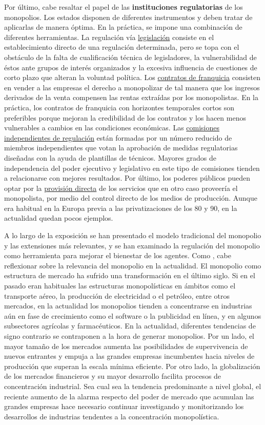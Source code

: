 \documentclass{nuevotema}
\begin{document}
Por último, cabe resaltar el papel de las \textbf{instituciones regulatorias} de los monopolios. Los estados disponen de diferentes instrumentos y deben tratar de aplicarlas de manera óptima. En la práctica, se impone una combinación de diferentes herramientas. La regulación vía \underline{legislación} consiste en el establecimiento directo de una regulación determinada, pero se topa con el obstáculo de la falta de cualificación técnica de legisladores, la vulnerabilidad de éstos ante grupos de interés organizados y la excesiva influencia de cuestiones de corto plazo que alteran la voluntad política. Los \underline{contratos de franquicia} consisten en vender a las empresas el derecho a monopolizar de tal manera que los ingresos derivados de la venta compensen las rentas extraídas por los monopolistas. En la práctica, los contratos de franquicia con horizontes temporales cortos son preferibles porque mejoran la credibilidad de los contratos y los hacen menos vulnerables a cambios en las condiciones económicas. Las \underline{comisiones independientes de regulación} están formadas por un número reducido de miembros independientes que votan la aprobación de medidas regulatorias diseñadas con la ayuda de plantillas de técnicos. Mayores grados de independencia del poder ejecutivo y legislativo en este tipo de comisiones tienden a relacionarse con mejores resultados. Por último, los poderes públicos pueden optar por la \underline{provisión directa} de los servicios que en otro caso proveería el monopolista, por medio del control directo de los medios de producción. Aunque era habitual en la Europa previa a las privatizaciones de los 80 y 90, en la actualidad quedan pocos ejemplos. 

A lo largo de la exposición se han presentado el modelo tradicional del monopolio y las extensiones más relevantes, y se han examinado la regulación del monopolio como herramienta para mejorar el bienestar de los agentes. Como , cabe reflexionar sobre la relevancia del monopolio en la actualidad. El monopolio como estructura de mercado ha sufrido una transformación en el último siglo. Si en el pasado eran habituales las estructuras monopolísticas en ámbitos como el transporte aéreo, la producción de electricidad o el petróleo, entre otros mercados, en la actualidad los monopolios tienden a concentrarse en industrias aún en fase de crecimiento como el software o la publicidad en línea, y en algunos subsectores agrícolas y farmacéuticos. En la actualidad, diferentes tendencias de signo contrario se contraponen a la hora de generar monopolios. Por un lado, el mayor tamaño de los mercados aumenta las posibilidades de supervivencia de nuevos entrantes y empuja a las grandes empresas incumbentes hacia niveles de producción que superan la escala mínima eficiente. Por otro lado, la globalización de los mercados financieros y su mayor desarrollo facilita procesos de concentración industrial. Sea cual sea la tendencia predominante a nivel global, el reciente aumento de la alarma respecto del poder de mercado que acumulan las grandes empresas hace necesario continuar investigando y monitorizando los desarrollos de industrias tendentes a la concentración monopolística.
\end{document}

